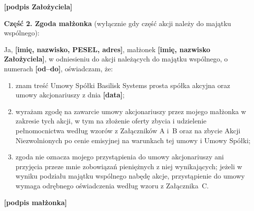 \documentclass[12pt,a4paper]{report}
\newcommand{\field}[1]{\textbf{[#1]}}
\newcommand{\CompanyFull}{Basilisk Systems prosta spółka akcyjna}
\begin{document}
\field{podpis Założyciela}

\textbf{Część 2. Zgoda małżonka} (wyłącznie gdy część akcji należy do majątku wspólnego):

Ja, \field{imię, nazwisko, PESEL, adres}, małżonek \field{imię, nazwisko Założyciela}, w odniesieniu do akcji należących do majątku wspólnego, o numerach \field{od--do}, oświadczam, że:

\begin{enumerate}
  \item znam treść Umowy Spółki \CompanyFull{} oraz umowy akcjonariuszy z dnia \field{data};
  \item wyrażam zgodę na zawarcie umowy akcjonariuszy przez mojego małżonka w zakresie tych akcji, w tym na złożenie oferty zbycia i udzielenie pełnomocnictwa według wzorów z Załączników A i~B oraz na zbycie Akcji Niezwolnionych po cenie emisyjnej na warunkach tej umowy i Umowy Spółki;
  \item zgoda nie oznacza mojego przystąpienia do umowy akcjonariuszy ani przyjęcia przeze mnie zobowiązań pieniężnych z niej wynikających; jeżeli w wyniku podziału majątku wspólnego nabędę akcje, przystąpienie do umowy wymaga odrębnego oświadczenia według wzoru z Załącznika~C.
\end{enumerate}

\field{podpis małżonka}
\end{document}
